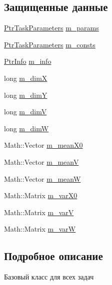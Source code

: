 \subsection*{Защищенные данные}
\begin{DoxyCompactItemize}
\item 
\hyperlink{namespace_core_a3e0e555656bf795146ebb0882e28da2f}{Ptr\+Task\+Parameters} \hyperlink{class_core_1_1_task_a99bf439867f7a4f38cde5eb142f4414a}{m\+\_\+params}
\item 
\hyperlink{namespace_core_a3e0e555656bf795146ebb0882e28da2f}{Ptr\+Task\+Parameters} \hyperlink{class_core_1_1_task_a1482a9a5e2a70c22fa58d2695a680890}{m\+\_\+consts}
\item 
\hyperlink{namespace_core_a647483da8a1266d5bbd3e9bb5cd66d08}{Ptr\+Info} \hyperlink{class_core_1_1_task_a259973874ba0b34cd7faccfd35dd683f}{m\+\_\+info}
\item 
long \hyperlink{class_core_1_1_task_a3314c516035accea22900aede28ee64b}{m\+\_\+dimX}
\item 
long \hyperlink{class_core_1_1_task_aa317bebd7f5dbfa5dc86463cb0377b12}{m\+\_\+dimY}
\item 
long \hyperlink{class_core_1_1_task_a2b117926018d3463708aa6e8657766b3}{m\+\_\+dimV}
\item 
long \hyperlink{class_core_1_1_task_a873b2d4f0d94068f327a18483a4c5318}{m\+\_\+dimW}
\item 
Math\+::\+Vector \hyperlink{class_core_1_1_task_a4482edff14b2fca2313e164614bb9693}{m\+\_\+mean\+X0}
\item 
Math\+::\+Vector \hyperlink{class_core_1_1_task_a420e36c620e30cd0f55689ce481c1391}{m\+\_\+meanV}
\item 
Math\+::\+Vector \hyperlink{class_core_1_1_task_a3391c29d286ebfae9e77cce5723f2e8c}{m\+\_\+meanW}
\item 
Math\+::\+Matrix \hyperlink{class_core_1_1_task_a06a945ef15de5b97494fd20ce88470a6}{m\+\_\+var\+X0}
\item 
Math\+::\+Matrix \hyperlink{class_core_1_1_task_af73402499755e2c2931b9d30456fd06a}{m\+\_\+varV}
\item 
Math\+::\+Matrix \hyperlink{class_core_1_1_task_af1239e6079214a8344c44b8ad4c3a23e}{m\+\_\+varW}
\end{DoxyCompactItemize}


\subsection{Подробное описание}
Базовый класс для всех задач 

